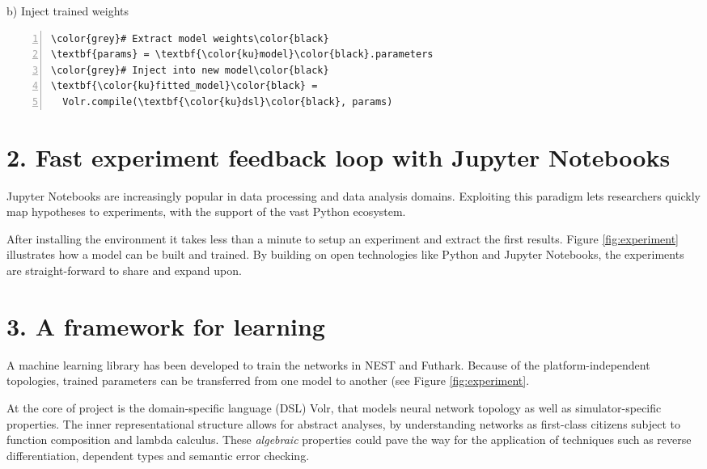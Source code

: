 \documentclass[a0,portrait]{a0poster}
\begin{document}
\begin{multicols}{2}
\begin{center}
\begin{multicols}{2}
b) Inject trained weights
\begin{Verbatim}[numbers=left,xleftmargin=5mm,commandchars=\\\{\}]
\color{grey}# Extract model weights\color{black}
\textbf{params} = \textbf{\color{ku}model}\color{black}.parameters
\color{grey}# Inject into new model\color{black}
\textbf{\color{ku}fitted_model}\color{black} = 
  Volr.compile(\textbf{\color{ku}dsl}\color{black}, params)
\end{Verbatim}
\end{multicols}
\vspace{-0.4cm}
\label{fig:experiment}
\end{center}
\vspace{0.1cm}

\section*{2. Fast experiment feedback loop with Jupyter Notebooks}
Jupyter Notebooks are increasingly popular in data processing and data analysis domains.
Exploiting this paradigm lets researchers quickly map hypotheses to experiments,
with the support of the vast Python ecosystem.

After installing the environment it takes less than a minute to setup an experiment and
extract the first results. 
Figure \ref{fig:experiment} illustrates how a model can be built and trained.
By building on open technologies like Python and Jupyter Notebooks, the experiments are
straight-forward to share and expand upon.

\section*{3. A framework for learning}
A machine learning library has been developed to train the networks in NEST and
Futhark.
Because of the platform-independent topologies, trained parameters can be
transferred from one model to another (see Figure \ref{fig:experiment}.

At the core of project is the domain-specific language (DSL) Volr, that models neural
network topology as well as simulator-specific properties. 
The inner representational structure allows for abstract analyses, by understanding networks
as first-class citizens subject to function composition and lambda calculus.
These \textit{algebraic} properties could pave the way for the application of techniques
such as reverse differentiation, dependent types and semantic error checking.


\end{multicols}
\end{document}
